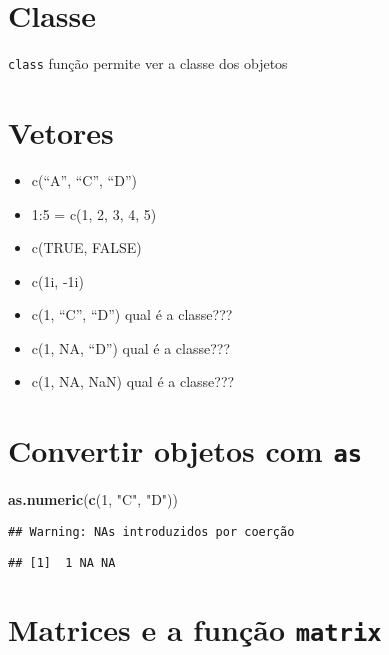 \documentclass[]{book}
\newenvironment{Shaded}{\begin{snugshade}}{\end{snugshade}}
\newcommand{\KeywordTok}[1]{\textcolor[rgb]{0.13,0.29,0.53}{\textbf{#1}}}
\newcommand{\DecValTok}[1]{\textcolor[rgb]{0.00,0.00,0.81}{#1}}
\newcommand{\StringTok}[1]{\textcolor[rgb]{0.31,0.60,0.02}{#1}}
\newcommand{\NormalTok}[1]{#1}
\providecommand{\tightlist}{%
  \setlength{\itemsep}{0pt}\setlength{\parskip}{0pt}}
\theoremstyle{definition}
\theoremstyle{definition}
\theoremstyle{definition}
\theoremstyle{remark}
\begin{document}
\section{Classe}\label{classe}

\texttt{class} função permite ver a classe dos objetos

\section{Vetores}\label{vetores}

\begin{itemize}
\tightlist
\item
  c(``A'', ``C'', ``D'')
\item
  1:5 = c(1, 2, 3, 4, 5)
\item
  c(TRUE, FALSE)
\item
  c(1i, -1i)
\item
  c(1, ``C'', ``D'') qual é a classe???
\item
  c(1, NA, ``D'') qual é a classe???
\item
  c(1, NA, NaN) qual é a classe???
\end{itemize}

\section{\texorpdfstring{Convertir objetos com
\texttt{as}}{Convertir objetos com as}}\label{convertir-objetos-com-as}

\begin{Shaded}
\begin{Highlighting}[]
\KeywordTok{as.numeric}\NormalTok{(}\KeywordTok{c}\NormalTok{(}\DecValTok{1}\NormalTok{, }\StringTok{"C"}\NormalTok{, }\StringTok{"D"}\NormalTok{))}
\end{Highlighting}
\end{Shaded}

\begin{verbatim}
## Warning: NAs introduzidos por coerção
\end{verbatim}

\begin{verbatim}
## [1]  1 NA NA
\end{verbatim}

\section{\texorpdfstring{Matrices e a função
\texttt{matrix}}{Matrices e a função matrix}}\label{matrices-e-a-funcao-matrix}
\end{document}
